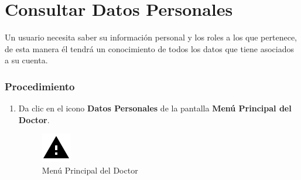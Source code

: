 \section{Consultar Datos Personales}

Un usuario necesita saber su información personal y los roles a los que pertenece, de esta manera él tendrá un conocimiento de todos los datos que tiene asociados a su cuenta.

\subsubsection{Procedimiento}
\begin{enumerate}
	
	\item Da clic en el icono \textbf{Datos Personales} de la pantalla \textbf{Menú Principal del Doctor}.

		\begin{figure}[!htbp]			\hypertarget{fig:mpDoctorCD}{\hspace{1pt}}
		\begin{center}
			\includegraphics[height=0.4\textheight]{images/Iconos/Advertencia}
			\caption{Menú Principal del Doctor}
			\label{fig:mpDoctorCD}
		\end{center}
	\end{figure}


\end{enumerate}
